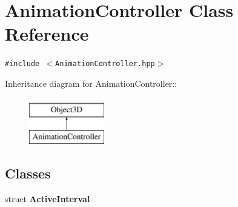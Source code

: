 \hypertarget{classm3g_1_1AnimationController}{
\section{AnimationController Class Reference}
\label{classm3g_1_1AnimationController}
}
{\tt \#include $<$AnimationController.hpp$>$}

Inheritance diagram for AnimationController::\begin{figure}[H]
\begin{center}
\leavevmode
\includegraphics[height=2cm]{classm3g_1_1AnimationController}
\end{center}
\end{figure}
\subsection*{Classes}
\begin{CompactItemize}
\item 
struct \textbf{ActiveInterval}
\end{CompactItemize}
